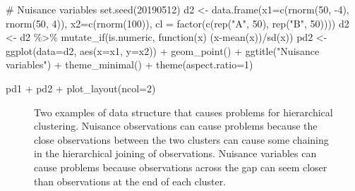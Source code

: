 \documentclass[
  letterpaper,
]{krantz}
\newenvironment{Shaded}{\begin{snugshade}}{\end{snugshade}}
\newcommand{\AttributeTok}[1]{\textcolor[rgb]{0.40,0.45,0.13}{#1}}
\newcommand{\CommentTok}[1]{\textcolor[rgb]{0.37,0.37,0.37}{#1}}
\newcommand{\ControlFlowTok}[1]{\textcolor[rgb]{0.00,0.23,0.31}{#1}}
\newcommand{\DecValTok}[1]{\textcolor[rgb]{0.68,0.00,0.00}{#1}}
\newcommand{\FunctionTok}[1]{\textcolor[rgb]{0.28,0.35,0.67}{#1}}
\newcommand{\NormalTok}[1]{\textcolor[rgb]{0.00,0.23,0.31}{#1}}
\newcommand{\OtherTok}[1]{\textcolor[rgb]{0.00,0.23,0.31}{#1}}
\newcommand{\SpecialCharTok}[1]{\textcolor[rgb]{0.37,0.37,0.37}{#1}}
\newcommand{\StringTok}[1]{\textcolor[rgb]{0.13,0.47,0.30}{#1}}
\begin{document}
\begin{Shaded}
\begin{Highlighting}[]
\CommentTok{\# Nuisance variables}
\FunctionTok{set.seed}\NormalTok{(}\DecValTok{20190512}\NormalTok{)}
\NormalTok{d2 }\OtherTok{\textless{}{-}} \FunctionTok{data.frame}\NormalTok{(}\AttributeTok{x1=}\FunctionTok{c}\NormalTok{(}\FunctionTok{rnorm}\NormalTok{(}\DecValTok{50}\NormalTok{, }\SpecialCharTok{{-}}\DecValTok{4}\NormalTok{), }
                            \FunctionTok{rnorm}\NormalTok{(}\DecValTok{50}\NormalTok{, }\DecValTok{4}\NormalTok{)),}
                 \AttributeTok{x2=}\FunctionTok{c}\NormalTok{(}\FunctionTok{rnorm}\NormalTok{(}\DecValTok{100}\NormalTok{)),}
                 \AttributeTok{cl =} \FunctionTok{factor}\NormalTok{(}\FunctionTok{c}\NormalTok{(}\FunctionTok{rep}\NormalTok{(}\StringTok{"A"}\NormalTok{, }\DecValTok{50}\NormalTok{), }
                             \FunctionTok{rep}\NormalTok{(}\StringTok{"B"}\NormalTok{, }\DecValTok{50}\NormalTok{))))}
\NormalTok{d2 }\OtherTok{\textless{}{-}}\NormalTok{ d2 }\SpecialCharTok{\%\textgreater{}\%} 
  \FunctionTok{mutate\_if}\NormalTok{(is.numeric, }\ControlFlowTok{function}\NormalTok{(x) (x}\SpecialCharTok{{-}}\FunctionTok{mean}\NormalTok{(x))}\SpecialCharTok{/}\FunctionTok{sd}\NormalTok{(x))}
\NormalTok{pd2 }\OtherTok{\textless{}{-}} \FunctionTok{ggplot}\NormalTok{(}\AttributeTok{data=}\NormalTok{d2, }\FunctionTok{aes}\NormalTok{(}\AttributeTok{x=}\NormalTok{x1, }\AttributeTok{y=}\NormalTok{x2)) }\SpecialCharTok{+} 
  \FunctionTok{geom\_point}\NormalTok{() }\SpecialCharTok{+}
    \FunctionTok{ggtitle}\NormalTok{(}\StringTok{"Nuisance variables"}\NormalTok{) }\SpecialCharTok{+} 
  \FunctionTok{theme\_minimal}\NormalTok{() }\SpecialCharTok{+}
    \FunctionTok{theme}\NormalTok{(}\AttributeTok{aspect.ratio=}\DecValTok{1}\NormalTok{)}

\NormalTok{pd1 }\SpecialCharTok{+}\NormalTok{ pd2 }\SpecialCharTok{+} \FunctionTok{plot\_layout}\NormalTok{(}\AttributeTok{ncol=}\DecValTok{2}\NormalTok{)}
\end{Highlighting}
\end{Shaded}

\begin{figure}[H]


\caption{\label{fig-problems}Two examples of data structure that causes
problems for hierarchical clustering. Nuisance observations can cause
problems because the close observations between the two clusters can
cause some chaining in the hierarchical joining of observations.
Nuisance variables can cause problems because observations across the
gap can seem closer than observations at the end of each cluster.}

\end{figure}%
\end{document}
